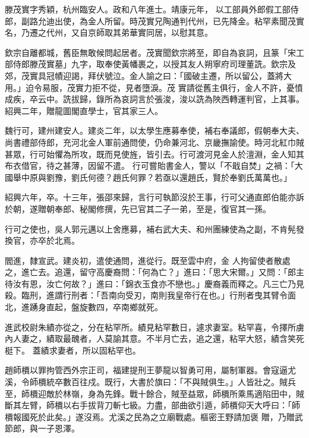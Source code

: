 \begin{pinyinscope}
 滕茂實字秀穎，杭州臨安人。政和八年進士。靖康元年，
 以工部員外郎假工部侍郎，副路允迪出使，為金人所留。時茂實兄陶通判代州，已先降金。粘罕素聞茂實名，乃遷之代州，又自京師取其弟華實同居，以慰其意。



 欽宗自離都城，舊臣無敢候問起居者。茂實聞欽宗將至，即自為哀詞，且篆「宋工部侍郎滕茂實墓」九字，取奉使黃幡裹之，以授其友人朔寧府司理董詵。欽宗及郊，茂實具冠幘迎謁，拜伏號泣。金人諭之曰：「國破主遷，所以留公，蓋將大用。」迫令易服，茂實力拒不從，見者墮淚。茂
 實請從舊主俱行，金人不許，憂憤成疾，卒云中。詵拔歸，錄所為哀詞言於張浚，浚以詵為陜西轉運判官，上其事。紹興二年，贈龍圖閣直學士，官其家三人。



 魏行可，建州建安人。建炎二年，以太學生應募奉使，補右奉議郎，假朝奉大夫、尚書禮部侍郎，充河北金人軍前通問使，仍命兼河北、京畿撫諭使。時河北紅巾賊甚眾，行可始懼為所攻，既而見使旌，皆引去。行可渡河見金人於澶淵，金人知其布衣借官，待之甚薄，因留不遣。
 行可嘗貽書金人，警以「不戢自焚」之禍：「大國舉中原與劉豫，劉氏何德？趙氏何罪？若亟以還趙氏，賢於奉劉氏萬萬也。」



 紹興六年，卒。十三年，張邵來歸，言行可執節沒於王事，行可父通直郎伯能亦訴於朝，遂贈朝奉郎、秘閣修撰，先已官其二子一弟，至是，復官其一孫。



 行可之使也，吳人郭元邁以上舍應募，補右武大夫、和州團練使為之副，不肯髡發換官，亦卒於北焉。



 閻進，隸宣武。建炎初，遣使通問，進從行。既至雲中府，金
 人拘留使者散處之，進亡去。追還，留守高慶裔問：「何為亡？」進曰：「思大宋爾。」又問：「郎主待汝有恩，汝亡何故？」進曰：「錦衣玉食亦不戀也。」慶裔義而釋之。凡三亡乃見殺。臨刑，進謂行刑者：「吾南向受刃，南則我皇帝行在也。」行刑者曳其臂令面北，進踴身直起，盤旋數四，卒南鄉就死。



 進武校尉朱績亦從之，分在粘罕所。績見粘罕數日，遽求妻室。粘罕喜，令擇所虜內人妻之，績取最醜者，人莫諭其意。不半月亡去，追之還，粘罕大怒，績含笑死梃下。
 蓋績求妻者，所以固粘罕也。



 趙師檟以罪拘管西外宗正司，福建提刑王夢龍以智勇可用，屬制軍器。會寇逼尤溪，令師檟統卒數百往戍。既行，大書於旗曰：「不與賊俱生。」人皆壯之。賊兵至，師檟迎敵於林嶺，身為先鋒。戰十餘合，賊至益眾，師檟所乘馬適陷田中，賊斷其左臂，師檟以右手拔背刀斬七級。力盡，部曲欲引遁，師檟仰天大呼曰：「師檟報國死於此矣。」遂沒焉。尤溪之民為之立廟戰處。樞密王野請加褒
 贈，乃贈武節郎，與一子恩澤。




\end{pinyinscope}
